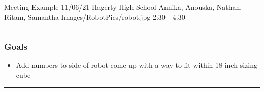 \insertmeeting 
	{Meeting Example} 
	{11/06/21}
	{Hagerty High School}
	{Annika, Anouska, Nathan, Ritam, Samantha}
	{Images/RobotPics/robot.jpg}
	{2:30 - 4:30}
	
\noindent\hfil\rule{\textwidth}{.4pt}\hfil
\subsubsection*{Goals}
\begin{itemize}
    \item Add numbers to side of robot
come up with a way to fit within 18 inch sizing cube


\end{itemize} 

\noindent\hfil\rule{\textwidth}{.4pt}\hfil

